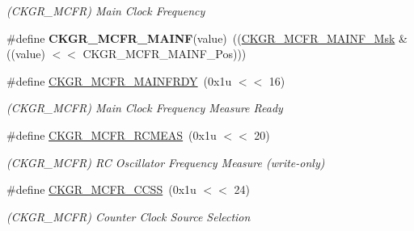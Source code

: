 \begin{DoxyCompactItemize}
\begin{DoxyCompactList}\small\item\em (C\+K\+G\+R\+\_\+\+M\+C\+FR) Main Clock Frequency \end{DoxyCompactList}\item 
\mbox{\label{group__SAME70__PMC_ga46513b9ed18c75421164bd8037494084}} 
\#define {\bfseries C\+K\+G\+R\+\_\+\+M\+C\+F\+R\+\_\+\+M\+A\+I\+NF}(value)~((\mbox{\hyperlink{group__SAMV71__PMC_ga57b367ae43ea4e0e406c54672607eaf8}{C\+K\+G\+R\+\_\+\+M\+C\+F\+R\+\_\+\+M\+A\+I\+N\+F\+\_\+\+Msk}} \& ((value) $<$$<$ C\+K\+G\+R\+\_\+\+M\+C\+F\+R\+\_\+\+M\+A\+I\+N\+F\+\_\+\+Pos)))
\item 
\mbox{\label{group__SAME70__PMC_ga7e1266d112bc784de35e25c613f827eb}} 
\#define \mbox{\hyperlink{group__SAME70__PMC_ga7e1266d112bc784de35e25c613f827eb}{C\+K\+G\+R\+\_\+\+M\+C\+F\+R\+\_\+\+M\+A\+I\+N\+F\+R\+DY}}~(0x1u $<$$<$ 16)
\begin{DoxyCompactList}\small\item\em (C\+K\+G\+R\+\_\+\+M\+C\+FR) Main Clock Frequency Measure Ready \end{DoxyCompactList}\item 
\mbox{\label{group__SAME70__PMC_ga8b91c852701958cc82ad83c6ab1930f9}} 
\#define \mbox{\hyperlink{group__SAME70__PMC_ga8b91c852701958cc82ad83c6ab1930f9}{C\+K\+G\+R\+\_\+\+M\+C\+F\+R\+\_\+\+R\+C\+M\+E\+AS}}~(0x1u $<$$<$ 20)
\begin{DoxyCompactList}\small\item\em (C\+K\+G\+R\+\_\+\+M\+C\+FR) RC Oscillator Frequency Measure (write-\/only) \end{DoxyCompactList}\item 
\mbox{\label{group__SAME70__PMC_ga9d97f5615199f9d8c084da0841e5292b}} 
\#define \mbox{\hyperlink{group__SAME70__PMC_ga9d97f5615199f9d8c084da0841e5292b}{C\+K\+G\+R\+\_\+\+M\+C\+F\+R\+\_\+\+C\+C\+SS}}~(0x1u $<$$<$ 24)
\begin{DoxyCompactList}\small\item\em (C\+K\+G\+R\+\_\+\+M\+C\+FR) Counter Clock Source Selection \end{DoxyCompactList}\item 
\mbox{\label{group__SAME70__PMC_ga6bea4fc8db6a33b79eddde5a59232816}} 

\end{DoxyCompactItemize}
